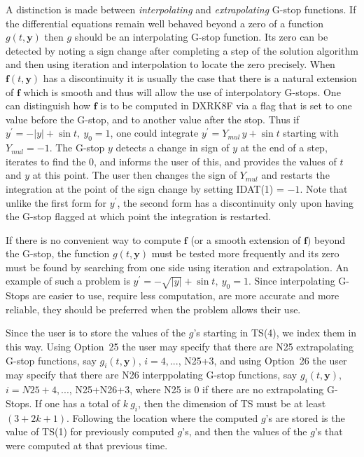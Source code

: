 \documentclass[twoside]{MATH77}
\begin{document}
A distinction is made between {\em interpolating} and {\em
  extrapolating} G-stop functions.  If the differential equations
remain well behaved beyond a zero of a function $g(t,{\mathbf y})$
then $g$ should be an interpolating G-stop function.  Its zero can be
detected by noting a sign change after completing a step of the
solution algorithm and then using iteration and interpolation to
locate the zero precisely.  When ${\mathbf f}(t,{\mathbf y})$ has a
discontinuity it is usually the case that there is a natural extension
of ${\mathbf f}$ which is smooth and thus will allow the use of
interpolatory G-stops.  One can distinguish how ${\mathbf f}$ is to be
computed in DXRK8F via a flag that is set to one value before the
G-stop, and to another value after the stop.  Thus if $y^{\prime} =
-|y| + \sin t,\ y_0 = 1$, one could integrate $y^{\prime} = Y_{mul}\,
y + \sin t$ starting with $Y_{mul} = -1$.  The G-stop $y$ detects a
change in sign of $y$ at the end of a step, iterates to find the 0,
and informs the user of this, and provides the values of $t$ and $y$
at this point.  The user then changes the sign of $Y_{mul}$ and
restarts the integration at the point of the sign change by setting
IDAT(1) = $-1$.  Note that unlike the first form for $y^{\prime}$, the
second form has a discontinuity only upon having the G-stop flagged at
which point the integration is restarted.

If there is no convenient way to compute ${\mathbf f}$ (or a smooth extension
of ${\mathbf f})$ beyond the G-stop, the function $g(t,{\mathbf y})$ must be
tested more frequently and its zero must be found by searching from one
side using iteration and extrapolation.  An example of such a problem is
$y^{\prime} = -\sqrt{|y|} + \sin t,\ y_0 = 1$.  Since interpolating
G-Stops are easier to use, require less computation, are more accurate and
more reliable, they should be preferred when the problem allows their
use.

Since the user is to store the values of the $g$'s starting in TS(4),
we index them in this way.  Using Option~25 the user may specify that
there are N25 extrapolating G-stop functions, say $g_i(t,{\mathbf
  y})$, $i=4,...$, N25+3, and using Option~26 the user may specify that
there are N26 interppolating G-stop functions, say $ g_i(t,{\mathbf
  y})$, $i=N25+4,...$, N25+N26+3, where N25 is 0 if there are no
extrapolating G-Stops.  If one has a total of $k\ g_i$, then the
dimension of TS must be at least $(3+2k+1)$.  Following the location
where the computed $g$'s are stored is the value of TS(1) for
previously computed $g$'s, and then the values of the $g$'s that were
computed at that previous time.
\end{document}
